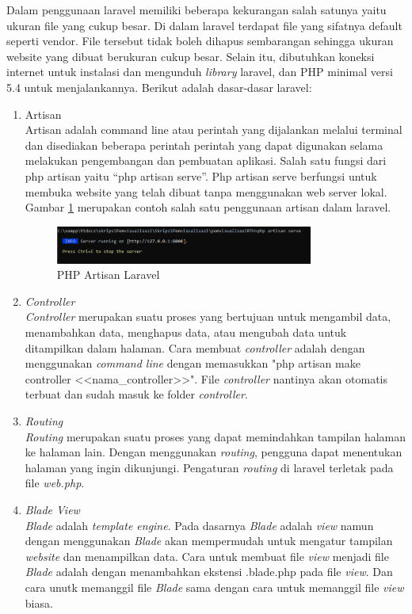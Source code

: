 Dalam penggunaan laravel memiliki beberapa kekurangan salah satunya yaitu ukuran file yang cukup besar. Di dalam laravel terdapat file yang sifatnya default seperti vendor. File tersebut tidak boleh dihapus sembarangan sehingga ukuran website yang dibuat berukuran cukup besar. Selain itu, dibutuhkan koneksi internet untuk instalasi dan mengunduh \textit{library} laravel, dan PHP minimal versi 5.4 untuk menjalankannya. Berikut adalah dasar-dasar laravel:
\begin{enumerate}
	\item Artisan \\
	Artisan adalah command line atau perintah yang dijalankan melalui terminal dan disediakan beberapa perintah perintah yang dapat digunakan selama melakukan pengembangan dan pembuatan aplikasi. Salah satu fungsi dari php artisan yaitu “php artisan serve”. Php artisan serve berfungsi untuk membuka website yang telah dibuat tanpa menggunakan web server lokal. Gambar \ref{fig:artisan} merupakan contoh salah satu penggunaan artisan dalam laravel.
	
	\begin{figure}[H]
		\centering
		\includegraphics[width=0.8\textwidth]{Gambar/artisan.png}
		\caption{PHP Artisan Laravel}
		\label{fig:artisan}
	\end{figure}
	\item \textit{Controller} \\
	\textit{Controller} merupakan suatu proses yang bertujuan untuk mengambil data, menambahkan data, menghapus data, atau mengubah data untuk ditampilkan dalam halaman. Cara membuat \textit{controller} adalah dengan menggunakan \textit{command line} dengan memasukkan "php artisan make controller <<nama\_controller>>". File \textit{controller} nantinya akan otomatis terbuat dan sudah masuk ke folder \textit{controller}.
	
	
	\item \textit{Routing} \\
	\textit{Routing} merupakan suatu proses yang dapat memindahkan tampilan halaman ke halaman lain. Dengan menggunakan \textit{routing}, pengguna dapat menentukan halaman yang ingin dikunjungi. Pengaturan \textit{routing} di laravel terletak pada file \textit{web.php}.
	
	
	\item \textit{Blade View} \\
	\textit{Blade} adalah \textit{template engine}. Pada dasarnya \textit{Blade} adalah \textit{view} namun dengan menggunakan \textit{Blade} akan mempermudah untuk mengatur tampilan \textit{website} dan menampilkan data. Cara untuk membuat file \textit{view} menjadi file \textit{Blade} adalah dengan menambahkan ekstensi .blade.php pada file \textit{view}. Dan cara unutk memanggil file \textit{Blade} sama dengan cara untuk memanggil file \textit{view} biasa.
\end{enumerate}	

